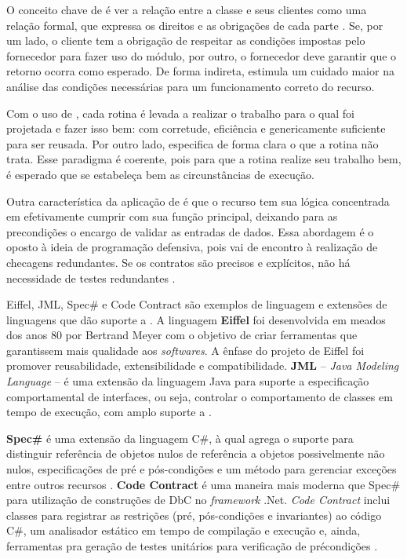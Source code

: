 O conceito chave de \designbycontract{} é ver a relação entre a classe e
seus clientes como uma relação formal, que expressa os direitos e as
obrigações de cada parte \cite{meyer1997object}. Se, por um lado, o
cliente tem a obrigação de respeitar as condições impostas pelo fornecedor para fazer uso do módulo, por
outro, o fornecedor deve garantir que o retorno ocorra como esperado. De forma
indireta, \designbycontract{} estimula um cuidado maior na análise das condições necessárias para um funcionamento correto do recurso.

Com o uso de \designbycontract{}, cada rotina é levada a realizar o trabalho
para o qual foi projetada e fazer isso bem: com corretude, eficiência e
genericamente suficiente para ser reusada. Por outro lado, especifica de forma
clara o que a rotina não trata. Esse paradigma é coerente, pois para que a
rotina realize seu trabalho bem, é esperado que se estabeleça bem as
circunstâncias de execução.

Outra característica da aplicação de \designbycontract{} é que o recurso tem sua
lógica concentrada em efetivamente cumprir com sua função principal, deixando
para as precondições o encargo de validar as entradas de dados. Essa abordagem
é o oposto à ideia de programação defensiva, pois vai de encontro à realização
de checagens redundantes. Se os contratos são precisos e explícitos, não há
necessidade de testes redundantes \cite{meyer1992applying}.

Eiffel, JML, Spec\# e Code Contract são exemplos de linguagem e extensões de
linguagens que dão suporte a \designbycontract{}. A linguagem \textbf{Eiffel} foi desenvolvida 
em meados dos anos 80 por
Bertrand Meyer \cite{meyer1988eiffel} com o objetivo de criar ferramentas que
garantissem mais qualidade aos \textit{softwares}. A ênfase do projeto de
Eiffel foi promover reusabilidade, extensibilidade e compatibilidade.
\textbf{JML} -- \textit{Java Modeling Language} -- é uma extensão da linguagem
Java para suporte a especificação comportamental de interfaces, ou seja, controlar o
comportamento de classes em tempo de execução, com amplo suporte a \designbycontract{}.


\textbf{Spec\#} é uma extensão da linguagem C\#, à qual agrega o suporte para
distinguir referência de objetos nulos de referência a objetos possivelmente não
nulos, especificações de pré e pós-condições e um método para gerenciar
exceções entre outros recursos \cite{barnett2004spec}. \textbf{Code Contract} é
uma maneira mais moderna que Spec\# para utilização de construções de DbC no 
\textit{framework} .Net. \textit{Code Contract} inclui classes para registrar as
restrições (pré, pós-condições e invariantes) ao código C\#, um analisador
estático em tempo de compilação e execução e, ainda, ferramentas pra
geração de testes unitários para verificação de précondições 
\cite{codecontractSite}.


